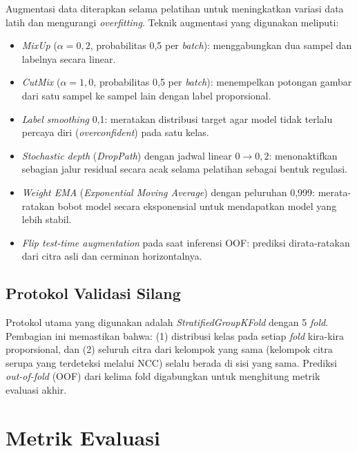 Augmentasi data diterapkan selama pelatihan untuk meningkatkan variasi data latih dan
mengurangi \textit{overfitting}. Teknik augmentasi yang digunakan meliputi:
\begin{itemize}
    \item \textit{MixUp} \citep{Zhang2018} ($\alpha = 0{,}2$, probabilitas 0,5 per \textit{batch}):
    menggabungkan dua sampel dan labelnya secara linear.
    \item \textit{CutMix} \citep{Yun2019} ($\alpha = 1{,}0$, probabilitas 0,5 per \textit{batch}):
    menempelkan potongan gambar dari satu sampel ke sampel lain dengan label proporsional.
    \item \textit{Label smoothing} 0,1: meratakan distribusi target agar model tidak terlalu
    percaya diri (\textit{overconfident}) pada satu kelas.
    \item \textit{Stochastic depth} (\textit{DropPath}) \citep{Huang2016} dengan jadwal
    linear $0 \rightarrow 0{,}2$: menonaktifkan sebagian jalur residual secara acak
    selama pelatihan sebagai bentuk regulasi.
    \item \textit{Weight EMA} (\textit{Exponential Moving Average}) dengan peluruhan 0,999:
    merata-ratakan bobot model secara eksponensial untuk mendapatkan model yang lebih stabil.
    \item \textit{Flip test-time augmentation} pada saat inferensi OOF: prediksi dirata-ratakan
    dari citra asli dan cerminan horizontalnya.
\end{itemize}

\subsection{Protokol Validasi Silang}

Protokol utama yang digunakan adalah \textit{StratifiedGroupKFold} dengan 5 \textit{fold}.
Pembagian ini memastikan bahwa: (1) distribusi kelas pada setiap \textit{fold} kira-kira
proporsional, dan (2) seluruh citra dari kelompok yang sama (kelompok citra serupa yang
terdeteksi melalui NCC) selalu berada di sisi yang sama. Prediksi \textit{out-of-fold} (OOF)
dari kelima fold digabungkan untuk menghitung metrik evaluasi akhir.

\section{Metrik Evaluasi}

